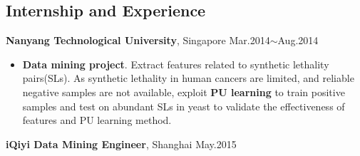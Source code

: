 \documentclass[margin]{res}
\begin{document}
\begin{resume}
\section{Internship and Experience}
\textbf{Nanyang Technological University}, Singapore \hfill Mar.2014$\sim$Aug.2014
\begin{itemize}
\item \textbf{Data mining project}. Extract features related to synthetic lethality pairs(SLs). As synthetic lethality in human cancers are limited, and reliable negative samples are not available, exploit \textbf{PU learning} to train positive samples and test on abundant SLs in yeast to validate the effectiveness of features and PU learning method.
\end{itemize}
\begin{spacing}{1.5}
\end{spacing}
\textbf{iQiyi Data Mining Engineer}, Shanghai \hfill May.2015

\end{resume}
\end{document}
